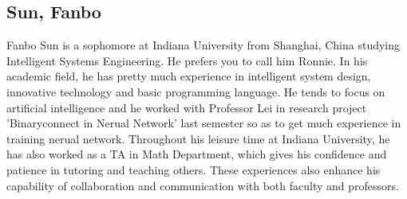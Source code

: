\subsection{Sun, Fanbo}

Fanbo Sun is a sophomore at Indiana University from Shanghai, China studying Intelligent Systems Engineering. 
He prefers you to call him Ronnie.  In his academic field, he has pretty much experience in intelligent system design, 
innovative technology and basic programming language. He tends to focus on artificial intelligence and he worked with 
Professor Lei in research project 'Binaryconnect in Nerual Network' last semester so as to get much experience in training 
nerual network.  Throughout his leisure time at Indiana University, he has also worked as a TA in Math Department, 
which gives his confidence and patience in tutoring and teaching others. These experiences also enhance his capability of 
collaboration and communication with both faculty and professors.
